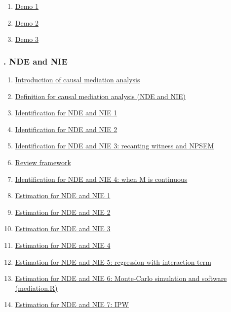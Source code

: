 \documentclass[11pt]{article}
\begin{document}
\begin{multicols}{3}
	\begin{enumerate}
		\item \href{https://mp.weixin.qq.com/s/6GagqDA5KoD1ITFghalsHA}{Demo 1}	%
		\item \href{https://mp.weixin.qq.com/s/gW1Ho58AGP0manJkTh7uRw}{Demo 2}	%
		\item \href{https://mp.weixin.qq.com/s/nc8LYP3OUiwaeXKXUIL3GA}{Demo 3}	%
	\end{enumerate}
\end{multicols}



\vspace{-1cm}

\subsubsection*{. NDE and NIE}

\vspace{-0.5cm}

\begin{enumerate}
	\item \href{https://mp.weixin.qq.com/s/Cw1v-UKBb9yigKF8q-yidg}{Introduction of causal mediation analysis}	%
	\item \href{https://mp.weixin.qq.com/s/F8WKmhrzXEyyiVd54RqZqA}{Definition for causal mediation analysis (NDE and NIE)}	%
	\item \href{https://mp.weixin.qq.com/s/DZnhE-gtiEh2iP0C9JmxeA}{Identification for NDE and NIE 1}	%
	\item \href{https://mp.weixin.qq.com/s/oXRnkyD_0JK9tQuipgnOWw}{Identification for NDE and NIE 2}	%
	\item \href{https://mp.weixin.qq.com/s/s5yrgAO913wcXmhOg-ysoQ}{Identification for NDE and NIE 3: recanting witness and NPSEM}	%
	\item \href{https://mp.weixin.qq.com/s/98U94FvD3D1oHK-HbdttPA}{Review framework}	%
	\item \href{https://mp.weixin.qq.com/s/UWTRO0gSPiswEDsIxtvPsA}{Identification for NDE and NIE 4: when M is continuous}	%
	\item \href{https://mp.weixin.qq.com/s/vBVU-ppWwzmZyUKgg0Kl4w}{Estimation for NDE and NIE 1}	%
	\item \href{https://mp.weixin.qq.com/s/bt0p9SKevVP9M4avaJctPw}{Estimation for NDE and NIE 2}	%
	\item \href{https://mp.weixin.qq.com/s/vAWnR_0fuI1AOJ0KQ_isTA}{Estimation for NDE and NIE 3}	%
	\item \href{https://mp.weixin.qq.com/s/SnOdeYG1GWulNHkrp1feCQ}{Estimation for NDE and NIE 4}	%
	\item \href{https://mp.weixin.qq.com/s/dEhVZrK9HF6A-c2Vxw5DTw}{Estimation for NDE and NIE 5: regression with interaction term}	%
	\item \href{https://mp.weixin.qq.com/s/Ryw632CtN_UNRRkzaYOXxw}{Estimation for NDE and NIE 6: Monte-Carlo simulation and software (mediation.R)}	%
	\item \href{https://mp.weixin.qq.com/s/-g18ym1rwA9dcfN4E0WEcg}{Estimation for NDE and NIE 7: IPW}	%
\end{enumerate}
\end{document}
